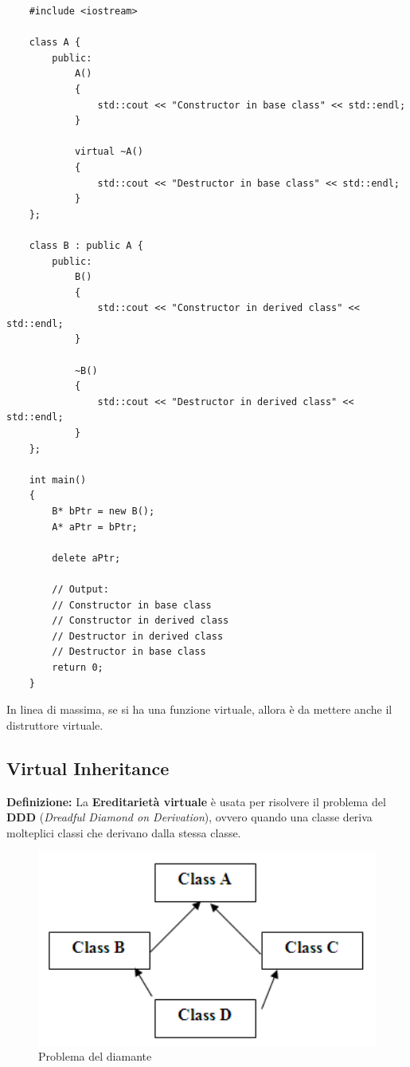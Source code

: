 \begin{lstlisting}
	#include <iostream>
	
	class A {
		public:
			A()
			{
				std::cout << "Constructor in base class" << std::endl;
			}	
		
			virtual ~A()
			{
				std::cout << "Destructor in base class" << std::endl;
			}
	};

	class B : public A {
		public:
			B()
			{
				std::cout << "Constructor in derived class" << std::endl;
			}
		
			~B()
			{
				std::cout << "Destructor in derived class" << std::endl;
			}
	};

	int main()
	{
		B* bPtr = new B();
		A* aPtr = bPtr;
		
		delete aPtr;
		
		// Output: 
		// Constructor in base class
		// Constructor in derived class
		// Destructor in derived class
		// Destructor in base class
		return 0;
	}
\end{lstlisting}

\textsf{\small In linea di massima, se si ha una funzione virtuale, allora è da mettere anche il distruttore virtuale.} \break

\subsection{Virtual Inheritance}

\textsf{\small \textbf{Definizione:} La \textbf{Ereditarietà virtuale} è usata per risolvere il problema del \textbf{DDD} (\emph{Dreadful Diamond on Derivation}), ovvero quando una classe deriva molteplici classi che derivano dalla stessa classe.} \\

\begin{figure}[H]
	\centering
	\includegraphics[width=1\textwidth, height=1\textheight, keepaspectratio]{./imgs/diamond_problem2.png}
	\caption{Problema del diamante}
	\label{fig:diamond_problem}
\end{figure}

